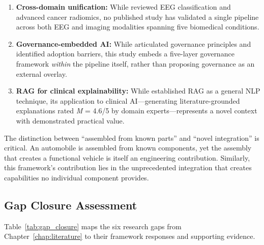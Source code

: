 \begin{enumerate}
    \item \textbf{Cross-domain unification:} While \citet{craik2019eeg} reviewed EEG classification and \citet{aerts2014radiomics} advanced cancer radiomics, no published study has validated a single pipeline across both EEG and imaging modalities spanning five biomedical conditions.

    \item \textbf{Governance-embedded AI:} While \citet{jobin2019ethics} articulated governance principles and \citet{kelly2019healthcare} identified adoption barriers, this study embeds a five-layer governance framework \textit{within} the pipeline itself, rather than proposing governance as an external overlay.

    \item \textbf{RAG for clinical explainability:} While \citet{lewis2020rag} established RAG as a general NLP technique, its application to clinical AI---generating literature-grounded explanations rated \textit{M} = 4.6/5 by domain experts---represents a novel context with demonstrated practical value.
\end{enumerate}

The distinction between ``assembled from known parts'' and ``novel integration'' is critical. An automobile is assembled from known components, yet the assembly that creates a functional vehicle is itself an engineering contribution. Similarly, this framework's contribution lies in the unprecedented integration that creates capabilities no individual component provides.

\subsection{Gap Closure Assessment}

Table~\ref{tab:gap_closure} maps the six research gaps from Chapter~\ref{chap:literature} to their framework responses and supporting evidence.

